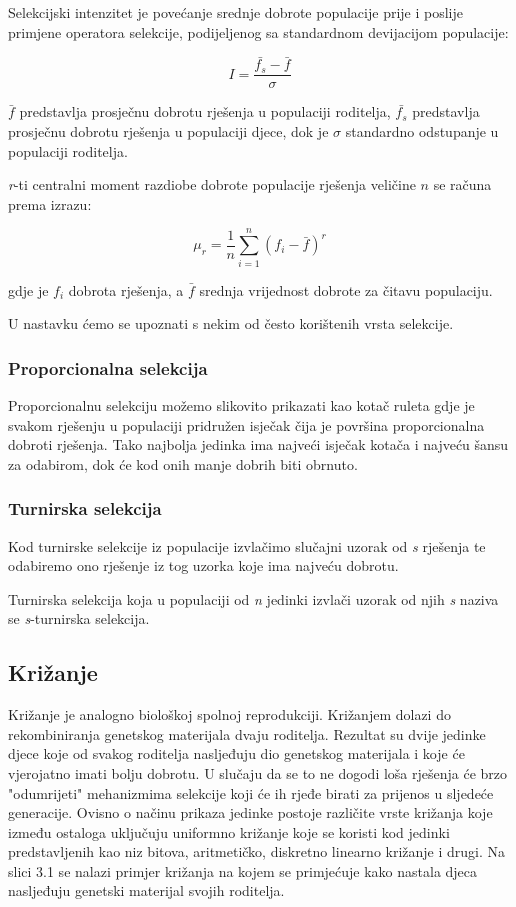 \documentclass[times, utf8, zavrsni]{fer}
\begin{document}
Selekcijski intenzitet je povećanje srednje dobrote populacije prije i poslije primjene operatora selekcije, podijeljenog sa standardnom devijacijom populacije:

\[ I = \frac{\bar{f_s} - \bar{f}}{\sigma} \]

$\bar{f} $ predstavlja prosječnu dobrotu rješenja u populaciji roditelja,  $\bar{f_s} $ predstavlja prosječnu dobrotu rješenja u populaciji djece, dok je $\sigma$ standardno odstupanje u populaciji roditelja.

\textit{r}-ti centralni moment razdiobe dobrote populacije rješenja veličine $n$ se računa prema izrazu:

\[ \mu_r = \frac1{n}\sum_{i=1}^{n}(f_i - \bar{f})^r \]

gdje je $f_i$ dobrota rješenja, a $\bar{f}$ srednja vrijednost dobrote za čitavu populaciju. 

U nastavku ćemo se upoznati s nekim od često korištenih vrsta selekcije.

\subsubsection{Proporcionalna selekcija}

Proporcionalnu selekciju možemo slikovito prikazati kao kotač ruleta gdje je svakom rješenju u populaciji pridružen isječak čija je površina proporcionalna dobroti rješenja. Tako najbolja jedinka ima najveći isječak kotača i najveću šansu za odabirom, dok će kod onih manje dobrih biti obrnuto.

\subsubsection{Turnirska selekcija}

Kod turnirske selekcije iz populacije izvlačimo slučajni uzorak od \textit{s} rješenja te odabiremo ono rješenje iz tog uzorka koje ima najveću dobrotu. 

Turnirska selekcija koja u populaciji od \textit{n} jedinki izvlači uzorak od njih \textit{s} naziva se \textit{s}-turnirska selekcija.

\subsection{Križanje}
Križanje je analogno biološkoj spolnoj reprodukciji. Križanjem dolazi do rekombiniranja genetskog materijala dvaju roditelja. Rezultat su dvije jedinke djece koje od svakog roditelja nasljeđuju dio genetskog materijala i koje će vjerojatno imati bolju dobrotu. U slučaju da se to ne dogodi loša rješenja će brzo "odumrijeti" mehanizmima selekcije koji će ih rjeđe birati za prijenos u sljedeće generacije. Ovisno o načinu prikaza jedinke postoje različite vrste križanja koje između ostaloga uključuju uniformno križanje koje se koristi kod jedinki predstavljenih kao niz bitova, aritmetičko, diskretno linearno križanje i drugi. Na slici 3.1 se nalazi primjer križanja na kojem se primjećuje kako nastala djeca nasljeđuju genetski materijal svojih roditelja.
\end{document}
